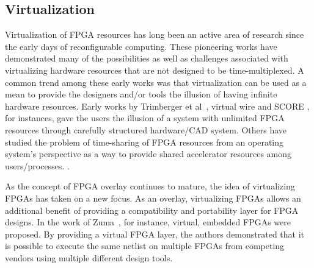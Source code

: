 \subsection{Virtualization}
Virtualization of FPGA resources has long been an active area of research since the early days of reconfigurable computing.  These pioneering works have demonstrated many of the possibilities as well as challenges associated with virtualizing hardware resources that are not designed to be time-multiplexed.  A common trend among these early works was that virtualization can be used as a mean to provide the designers and/or tools the illusion of having infinite hardware resources.  Early works by Trimberger et al~\cite{Trimberger97}, virtual wire\cite{virtualwire} and SCORE \cite{score}, for instances, gave the users the illusion of a system with unlimited FPGA resources through carefully structured hardware/CAD system.  Others have studied the problem of time-sharing of FPGA resources from an operating system's perspective as a way to provide shared accelerator resources among users/processes. \cite{Lubbers:2009:RMP:1596532.1596540,SoTECS08,Fu:2005:FCCM}.

As the concept of FPGA overlay continues to mature, the idea of virtualizing FPGAs has taken on a new focus.  As an overlay, virtualizing FPGAs allows an additional benefit of providing a compatibility and portability layer for FPGA designs.  In the work of Zuma~\cite{zuma2012}, for instance, virtual, embedded FPGAs were proposed.  By providing a virtual FPGA layer, the authors demonstrated that it is possible to execute the same netlist on multiple FPGAs from competing vendors using multiple different design tools.

\iffalse
\subsection{Improved Design Productivity}
An important benefit of using FPGA overlays is that they promise to improve designer's productivity in developing FPGA applications.
Design productivity is hard to measure, but has long been regarded as one of the key barrier-to-entry for novice users to start using FPGAs for their applications \cite{SoFpl06}.
In particular, FPGA overlays are particularly helpful in addressing two important aspects of this design productivity challenges: 
\begin{itemize}
\item Reduced compilation time
\item Application debug
\end{itemize}
\fi

